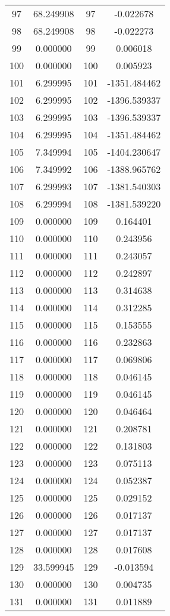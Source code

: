 \documentclass[12pt]{article}
\begin{document}
\begin{longtable}{@{}cccc@{}}
97 & 68.249908 & 97 & -0.022678 \\
98 & 68.249908 & 98 & -0.022273 \\
99 & 0.000000 & 99 & 0.006018 \\
100 & 0.000000 & 100 & 0.005923 \\
101 & 6.299995 & 101 & -1351.484462 \\
102 & 6.299995 & 102 & -1396.539337 \\
103 & 6.299995 & 103 & -1396.539337 \\
104 & 6.299995 & 104 & -1351.484462 \\
105 & 7.349994 & 105 & -1404.230647 \\
106 & 7.349992 & 106 & -1388.965762 \\
107 & 6.299993 & 107 & -1381.540303 \\
108 & 6.299994 & 108 & -1381.539220 \\
109 & 0.000000 & 109 & 0.164401 \\
110 & 0.000000 & 110 & 0.243956 \\
111 & 0.000000 & 111 & 0.243057 \\
112 & 0.000000 & 112 & 0.242897 \\
113 & 0.000000 & 113 & 0.314638 \\
114 & 0.000000 & 114 & 0.312285 \\
115 & 0.000000 & 115 & 0.153555 \\
116 & 0.000000 & 116 & 0.232863 \\
117 & 0.000000 & 117 & 0.069806 \\
118 & 0.000000 & 118 & 0.046145 \\
119 & 0.000000 & 119 & 0.046145 \\
120 & 0.000000 & 120 & 0.046464 \\
121 & 0.000000 & 121 & 0.208781 \\
122 & 0.000000 & 122 & 0.131803 \\
123 & 0.000000 & 123 & 0.075113 \\
124 & 0.000000 & 124 & 0.052387 \\
125 & 0.000000 & 125 & 0.029152 \\
126 & 0.000000 & 126 & 0.017137 \\
127 & 0.000000 & 127 & 0.017137 \\
128 & 0.000000 & 128 & 0.017608 \\
129 & 33.599945 & 129 & -0.013594 \\
130 & 0.000000 & 130 & 0.004735 \\
131 & 0.000000 & 131 & 0.011889 \\

\end{longtable}
\end{document}
